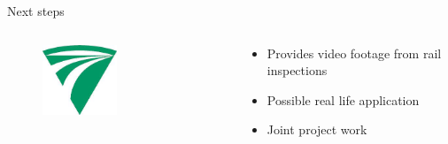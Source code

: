 \documentclass[aspectratio=169]{beamer}
\begin{document}
\begin{frame}{Next steps}
    \begin{columns}[T]
        \begin{column}{0.3\textwidth}
            \begin{figure}[H]
                \centering
                \includegraphics[width=0.5\textwidth]{./tex_images/mav_kfv_logo.jpeg}
            \end{figure}
        \end{column}
        \pause
        \begin{column}{0.65\textwidth}
            \vspace*{0.5cm}
            \begin{itemize}
                \item Provides video footage from rail inspections
                \item Possible real life application
                \item Joint project work
            \end{itemize}
        \end{column}
    \end{columns}
\end{frame}
\end{document}
